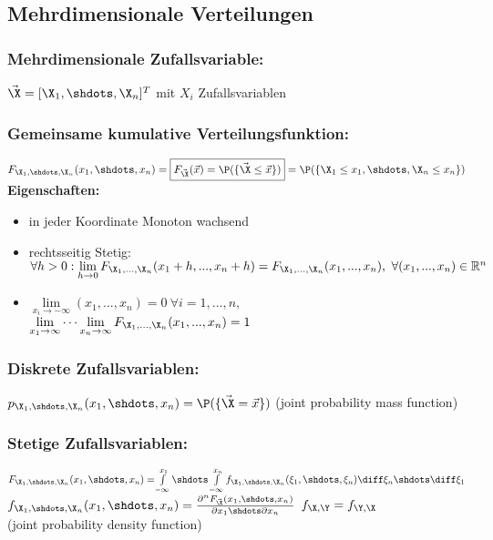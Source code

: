 \documentclass[german,color,6pt]{latex4ei/latex4ei_sheet}
\begin{document}
\begin{sectionbox}
	\subsection{Mehrdimensionale Verteilungen}
	\subsubsection{Mehrdimensionale Zufallsvariable:}
	$\vec{\X} = [\X_1,\shdots,\X_n]^T$ mit $X_i$ Zufallsvariablen
	\subsubsection{Gemeinsame kumulative Verteilungsfunktion:}
	$F_{\X_1,\shdots,\X_n}(x_1,\shdots,x_n) = \boxed{F_{\vec{\X}}(\vec{x}) = \P(\{\vec{\X} \leq \vec{x}\})} = \newline
	\P(\{\X_1 \leq x_1,\shdots,\X_n \leq x_n\})$\\
	\textbf{Eigenschaften:}
	\begin{itemize}
	\item in jeder Koordinate Monoton wachsend
	\item rechtsseitig Stetig: $\forall h>0:\lim\limits_{h\rightarrow 0}F_{\X_1,...,\X_n}(x_1+h,...,x_n+h) = F_{\X_1,...,\X_n}(x_1,...,x_n),~\forall (x_1,...,x_n)\in\mathbb{R}^n$
	\item $\lim\limits_{x_i\rightarrow -\infty}(x_1,...,x_n) = 0~\forall i=1,...,n,$\\
	$\lim\limits_{x_1\rightarrow\infty}\cdots\lim\limits_{x_n\rightarrow\infty}F_{\X_1,...,\X_n}(x_1,...,x_n)=1$
	\end{itemize}
	\subsubsection{Diskrete Zufallsvariablen:}
	$p_{\X_1,\shdots,\X_n}(x_1,\shdots,x_n) = \P(\{\vec{\X} = \vec{x}\})$ (joint probability mass function)
	\subsubsection{Stetige Zufallsvariablen:}
	$F_{\X_1,\shdots,\X_n}(x_1,\shdots,x_n) =\! \int\limits_{-\infty}^{x_1}\shdots\int\limits_{-\infty}^{x_n}{f_{\X_1,\shdots,\X_n}(\xi_1,\shdots,\xi_n)\diff\xi_n\shdots\diff\xi_1}$\\
	$f_{\X_1,\shdots,\X_n}(x_1,\shdots,x_n) = \frac{\partial^n F_{\vec{\X}}(x_1,\shdots,x_n)}{\partial x_1\shdots\partial x_n}$ \hfill $f_{\X,\Y} = f_{\Y,\X}$\\
	(joint probability density function)


\end{sectionbox}
\end{document}
